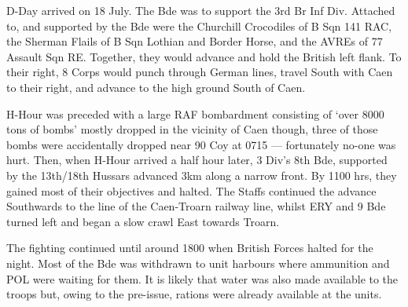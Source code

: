 \documentclass[noraggedright]{turabian-researchpaper}
\newcommand{\GoodAdm}{27 Armd Bde Adm Order No. 3, Operation ``GOODWOOD'', 
17 July 1944}
\begin{document}


D-Day  arrived on 18 July.  The Bde was to support the 3rd Br Inf Div.  
Attached to, and supported by the Bde were the Churchill Crocodiles of B Sqn
141 RAC, the Sherman Flails of B Sqn Lothian and Border Horse, and the AVREs
of 77 Assault Sqn RE.  Together, they would advance and hold the British left
flank.  To their right, 8 Corps would punch through German lines, travel South
with Caen to their right, and advance to the high ground South of 
Caen.\autocite[\GoodAdm][para 2]{27wd}

H-Hour was preceded with a large RAF bombardment consisting of `over 8000 tons 
of bombs' mostly dropped in the vicinity of Caen though, three of those bombs
were accidentally dropped near 90 Coy at 0715 --- fortunately no-one was 
hurt.\autocites[18 July 1944]{27wd}[18 July 1944]{90wd}
Then, when H-Hour arrived a half hour later, 3 Div's 8th Bde, supported by 
the 13th/18th Hussars advanced 3km along a narrow front.  By 1100 hrs, they 
gained most of their objectives and halted.  The Staffs continued the advance 
Southwards to the line of the Caen-Troarn railway line, whilst ERY and 9 Bde 
turned left and began a slow crawl East towards Troarn.\autocite[18 July 1944]
{27wd}

The fighting continued until around 1800 when British Forces halted for the
night.  Most of the Bde was withdrawn to unit harbours where ammunition and 
POL were waiting for them. %
It is likely that water was also made available to the troops but, owing to 
the pre-issue, rations were already available at the units.  
\end{document}
